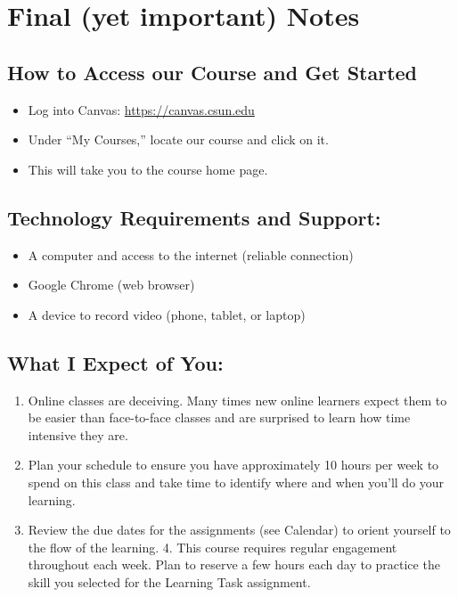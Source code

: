 \documentclass[11pt,]{article}
\providecommand{\tightlist}{%
  \setlength{\itemsep}{0pt}\setlength{\parskip}{0pt}}
\begin{document}
\hypertarget{final-yet-important-notes}{%
\section{Final (yet important) Notes}\label{final-yet-important-notes}}

\hypertarget{how-to-access-our-course-and-get-started}{%
\subsection{How to Access our Course and Get
Started}\label{how-to-access-our-course-and-get-started}}

\begin{itemize}
\tightlist
\item
  Log into Canvas: \url{https://canvas.csun.edu}
\item
  Under ``My Courses,'' locate our course and click on it.
\item
  This will take you to the course home page.
\end{itemize}

\hypertarget{technology-requirements-and-support}{%
\subsection{Technology Requirements and
Support:}\label{technology-requirements-and-support}}

\begin{itemize}
\tightlist
\item
  A computer and access to the internet (reliable connection)
\item
  Google Chrome (web browser)
\item
  A device to record video (phone, tablet, or laptop)
\end{itemize}

\hypertarget{what-i-expect-of-you}{%
\subsection{What I Expect of You:}\label{what-i-expect-of-you}}

\begin{enumerate}
\def\labelenumi{\arabic{enumi}.}
\tightlist
\item
  Online classes are deceiving. Many times new online learners expect
  them to be easier than face-to-face classes and are surprised to learn
  how time intensive they are.
\item
  Plan your schedule to ensure you have approximately 10 hours per week
  to spend on this class and take time to identify where and when you'll
  do your learning.
\item
  Review the due dates for the assignments (see Calendar) to orient
  yourself to the flow of the learning. 4. This course requires regular
  engagement throughout each week. Plan to reserve a few hours each day
  to practice the skill you selected for the Learning Task assignment.
\end{enumerate}
\end{document}
